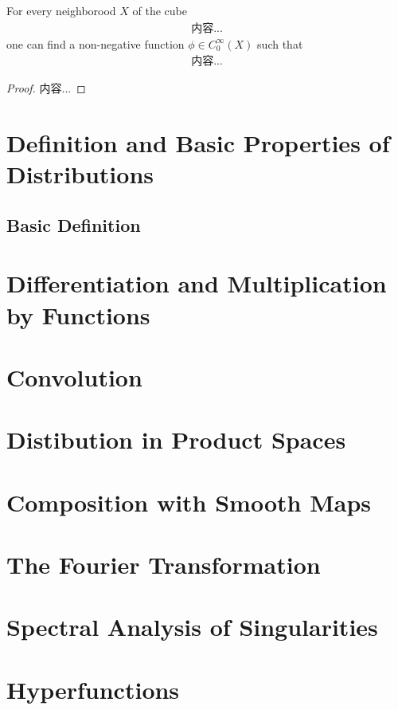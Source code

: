 \documentclass[Total.tex]{subfiles}
\begin{document}
			\begin{theorem}
				For every neighborood $X$ of the cube
				\begin{gather*}
					内容...
				\end{gather*}
				one can find a non-negative function $\phi\in C_0^\infty(X)$ such that
				\begin{gather*}
					内容...
				\end{gather*}
			\end{theorem}
			\begin{proof}
				内容...
			\end{proof}
	\chapter{Definition and Basic Properties of Distributions}
		\section{Basic Definition}
	\chapter{Differentiation and Multiplication by Functions}
	\chapter{Convolution}
	\chapter{Distibution in Product Spaces}
	\chapter{Composition with Smooth Maps}
	\chapter{The Fourier Transformation}
	\chapter{Spectral Analysis of Singularities}
	\chapter{Hyperfunctions}
\end{document}
